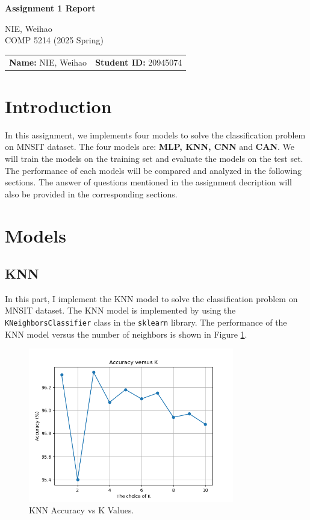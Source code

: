 \documentclass[12pt]{article}
\begin{document}
\begin{center}
    {\Large \textbf{Assignment 1 Report}}
    
    NIE, Weihao \\
    COMP 5214 (2025 Spring) \\
    
    \vspace{1em}
    \begin{tabular}{ll}
        \textbf{Name:} NIE, Weihao & \textbf{Student ID:} 20945074 \\
    \end{tabular}
\end{center}

\section{Introduction}
In this assignment, we implements four models to solve the classification problem on MNSIT dataset. 
The four models are: \textbf{MLP, KNN, CNN} and \textbf{CAN}. We will train the models on the training set and evaluate the models on the test set.
The performance of each models will be compared and analyzed in the following sections.
The answer of questions mentioned in the assignment decription will also be provided in the corresponding sections.

\section{Models}

\subsection{KNN}

In this part, I implement the KNN model to solve the classification problem on MNSIT dataset.
The KNN model is implemented by using the \texttt{KNeighborsClassifier} class in the \texttt{sklearn} library.
The performance of the KNN model versus the number of neighbors is shown in Figure \ref{fig:knn_accuracy}.

\begin{figure}[H] %
  \centering
  \includegraphics[width=0.8\textwidth]{KNN.png} %
  \caption{KNN Accuracy vs K Values.}
  \label{fig:knn_accuracy} %
\end{figure}
\end{document}
